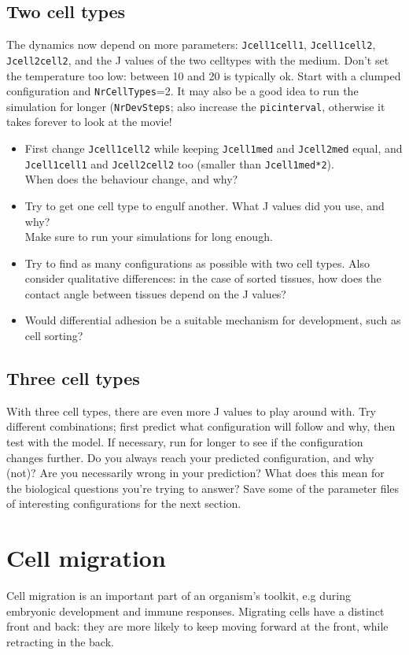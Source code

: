\documentclass[a4paper,10pt]{article}
\begin{document}
\subsection{Two cell types}
The dynamics now depend on more parameters: \texttt{Jcell1cell1}, \texttt{Jcell1cell2}, \texttt{Jcell2cell2}, and the J values of the two celltypes with the medium. Don't set the temperature too low: between 10 and 20 is typically ok. Start with a clumped configuration and \texttt{NrCellTypes}=2. It may also be a good idea to run the simulation for longer (\texttt{NrDevSteps}; also increase the \texttt{picinterval}, otherwise it takes forever to look at the movie!
\begin{itemize}
 \item First change \texttt{Jcell1cell2} while keeping \texttt{Jcell1med} and \texttt{Jcell2med} equal, and \texttt{Jcell1cell1} and \texttt{Jcell2cell2} too (smaller than \texttt{Jcell1med*2}). \\ When does the behaviour change, and why?
 \item Try to get one cell type to engulf another. What J values did you use, and why? \\Make sure to run your simulations for long enough.
 \item Try to find as many configurations as possible with two cell types. Also consider qualitative differences: in the case of sorted tissues, how does the contact angle between tissues depend on the J values?
 \item Would differential adhesion be a suitable mechanism for development, such as cell sorting?
\end{itemize}

\subsection{Three cell types}
With three cell types, there are even more J values to play around with. Try different combinations; first predict what configuration will 
follow and why, then test with the model. If necessary, run for longer to see if the configuration 
changes further. Do you always reach your predicted configuration, and why (not)? Are you necessarily wrong in your prediction? What does this mean 
for the biological questions you're trying to answer? Save some of the parameter files of interesting configurations for the next section.


\section{Cell migration}
Cell migration is an important part of an organism's toolkit, e.g during embryonic development and immune responses. Migrating cells have a distinct 
front and back: they are more likely to keep moving forward at the front, while retracting in the back. 
\end{document}
